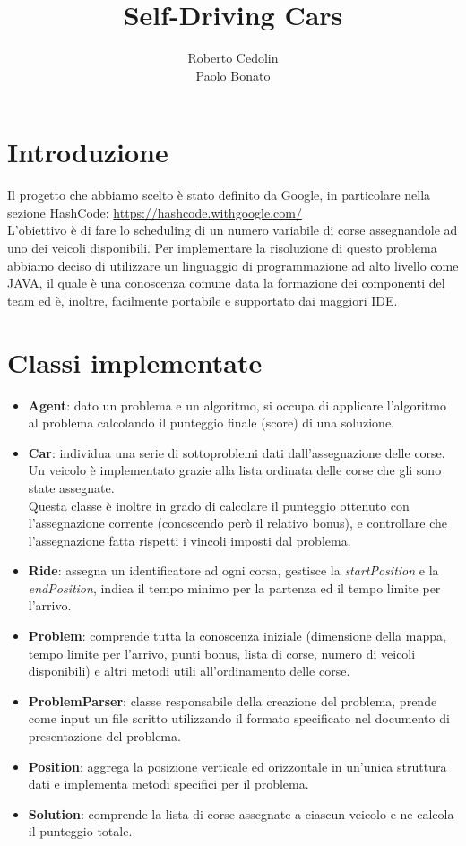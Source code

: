 \documentclass[11pt,a4paper]{article}
\begin{document}
\title{Self-Driving Cars}
\author[1]{Roberto Cedolin\\Paolo Bonato}
\maketitle
\section{Introduzione}
Il progetto che abbiamo scelto è stato definito da Google, in particolare nella sezione HashCode: \url{https://hashcode.withgoogle.com/}\\
L’obiettivo è di fare lo scheduling di un numero variabile di corse assegnandole ad uno dei veicoli disponibili.
Per implementare la risoluzione di questo problema abbiamo deciso di utilizzare un linguaggio di programmazione ad alto livello come JAVA, il quale è una conoscenza comune data la formazione dei componenti del team ed è, inoltre, facilmente portabile e supportato dai maggiori IDE.
\section{Classi implementate}
\begin{itemize}
	\item \textbf{Agent}: dato un problema e un algoritmo, si occupa di applicare l’algoritmo al problema calcolando il punteggio finale (score) di una soluzione.
	\item \textbf{Car}: individua una serie di sottoproblemi dati dall'assegnazione delle corse. Un veicolo è implementato grazie alla lista ordinata delle corse che gli sono state assegnate. \\
	Questa classe è inoltre in grado di calcolare il punteggio ottenuto con l'assegnazione corrente (conoscendo però il relativo bonus), e controllare che l'assegnazione fatta rispetti i vincoli imposti dal problema.
	\item \textbf{Ride}: assegna un identificatore ad ogni corsa, gestisce la \textit{startPosition} e la \textit{endPosition}, indica il tempo minimo per la partenza ed il tempo limite per l'arrivo.
	\item \textbf{Problem}: comprende tutta la conoscenza iniziale (dimensione della mappa, tempo limite per l'arrivo, punti bonus, lista di corse, numero di veicoli disponibili) e altri metodi utili all’ordinamento delle corse.
	\item \textbf{ProblemParser}: classe responsabile della creazione del problema, prende come input un file scritto utilizzando il formato specificato nel documento di presentazione del problema.
	\item \textbf{Position}: aggrega la posizione verticale ed orizzontale in un'unica struttura dati e implementa metodi specifici per il problema.
	\item \textbf{Solution}: comprende la lista di corse assegnate a ciascun veicolo e ne calcola il punteggio totale.
\end{itemize}
\end{document}
